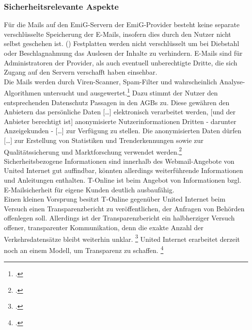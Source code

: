 \documentclass  [paper=a4,
				fontsize=12pt,
				listof=totoc,
				bibliography=totoc
				]{scrreprt}
\begin{document}
		\subsubsection{Sicherheitsrelevante Aspekte}
			Für die Mails auf den EmiG-Servern der EmiG-Provider besteht keine separate verschlüsselte Speicherung der E-Mails, insofern dies durch den Nutzer nicht selbst geschehen ist. ()
			Festplatten werden nicht verschlüsselt um bei Diebstahl oder Beschlagnahmung das Auslesen der Inhalte zu verhindern.
			E-Mails sind für Administratoren der Provider, als auch eventuell unberechtigte Dritte, die sich Zugang auf den Servern verschafft haben einsehbar.\\
			Die Mails werden durch Viren-Scanner, Spam-Filter und wahrscheinlich Analyse-Algorithmen untersucht und ausgewertet.\footcite[Vgl.][]{Kurz13}
			Dazu stimmt der Nutzer den entsprechenden Datenschutz Passagen in den AGBs zu. Diese gewähren den Anbietern das \glqq [\dots] persönliche Daten [\dots] elektronisch verarbeitet werden, [und der Anbieter berechtigt ist] anonymisierte Nutzerinformationen Dritten - darunter Anzeigekunden - [\dots] zur Verfügung zu stellen. Die anonymisierten Daten dürfen [\dots] zur Erstellung von Statistiken und Trenderkennungen sowie zur Qualitätssicherung und Marktforschung verwendet werden.\grqq \footcite{Web2012}\\
			Sicherheitsbezogene Informationen sind innerhalb des Webmail-Angebote von United Internet gut auffindbar, könnten allerdings weiterführende Informationen und Anleitungen enthalten.
			T-Online ist beim Angebot von Informationen bzgl. E-Mailsicherheit für eigene Kunden deutlich ausbaufähig.\\
			Einen kleinen Vorsprung besitzt T-Online gegenüber United Internet beim Versuch einen Transparenzbericht zu veröffentlichen, der Anfragen von Behörden offenlegen soll.
			Allerdings ist der Transparenzbericht ein halbherziger Versuch offener, transparenter Kommunikation, denn  die exakte Anzahl der Verkehrsdatensätze bleibt weiterhin unklar.
			\footcite[Vgl.][]{Beuth14}
			United Internet erarbeitet derzeit noch an einem Modell, um Transparenz zu schaffen.
			\footcite[Vgl.][]{Boehm14}
\end{document}
